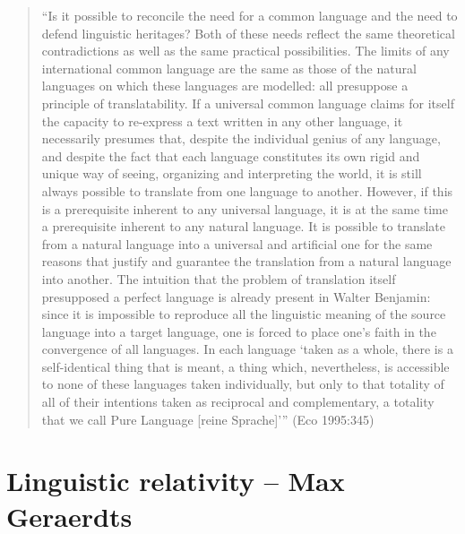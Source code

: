 \begin{minipage}{\textwidth}
\begin{quote}
\begin{singlespace}
“Is it possible to reconcile the need for a common language and the need to defend linguistic heritages? Both of these needs reflect the same theoretical contradictions as well as the same practical possibilities. The limits of any international common language are the same as those of the natural languages on which these languages are modelled: all presuppose a principle of translatability. If a universal common language claims for itself the capacity to re-express a text written in any other language, it necessarily presumes that, despite the individual genius of any language, and despite the fact that each language constitutes its own rigid and unique way of seeing, organizing and interpreting the world, it is still always possible to translate from one language to another. However, if this is a prerequisite inherent to any universal language, it is at the same time a prerequisite inherent to any natural language. It is possible to translate from a natural language into a universal and artificial one for the same reasons that justify and guarantee the translation from a natural language into another. The intuition that the problem of translation itself presupposed a perfect language is already present in Walter Benjamin: since it is impossible to reproduce all the linguistic meaning of the source language into a target language, one is forced to place one’s faith in the convergence of all languages. In each language ‘taken as a whole, there is a self-identical thing that is meant, a thing which, nevertheless, is accessible to none of these languages taken individually, but only to that totality of all of their intentions taken as reciprocal and complementary, a totality that we call Pure Language [reine Sprache]’” (Eco 1995:345)
\end{singlespace}
\end{quote}
\end{minipage}

\section{Linguistic relativity -- {\small Max Geraerdts}}


